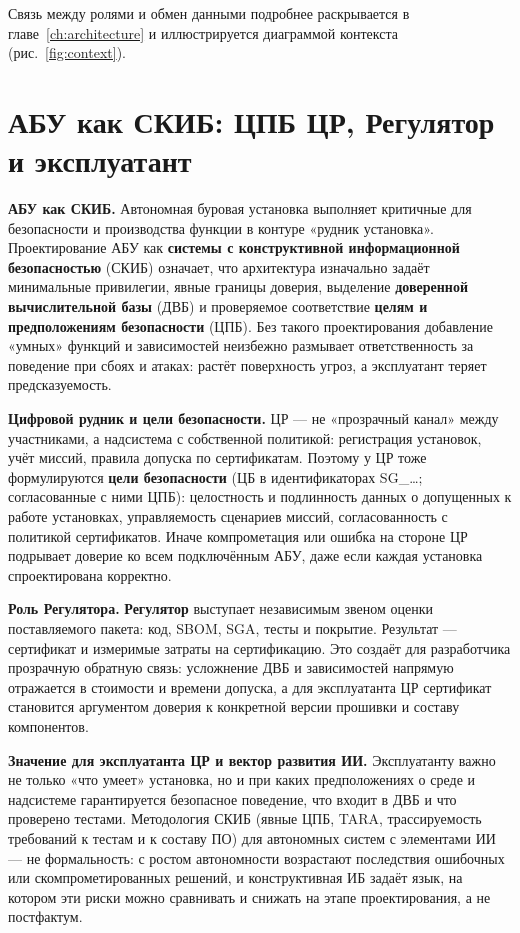 Связь между ролями и обмен данными подробнее раскрывается в главе~\ref{ch:architecture} и иллюстрируется диаграммой контекста (рис.~\ref{fig:context}).

\section{АБУ как СКИБ: ЦПБ ЦР, Регулятор и эксплуатант}
\label{sec:skib-why}

\textbf{АБУ как СКИБ.} Автономная буровая установка выполняет критичные для безопасности и производства функции в контуре «рудник\,\textemdash\,установка». Проектирование АБУ как \textbf{системы с конструктивной информационной безопасностью} (СКИБ) означает, что архитектура изначально задаёт минимальные привилегии, явные границы доверия, выделение \textbf{доверенной вычислительной базы} (ДВБ) и проверяемое соответствие \textbf{целям и предположениям безопасности} (ЦПБ). Без такого проектирования добавление «умных» функций и зависимостей неизбежно размывает ответственность за поведение при сбоях и атаках: растёт поверхность угроз, а эксплуатант теряет предсказуемость.

\textbf{Цифровой рудник и цели безопасности.} ЦР --- не «прозрачный канал» между участниками, а надсистема с собственной политикой: регистрация установок, учёт миссий, правила допуска по сертификатам. Поэтому у ЦР тоже формулируются \textbf{цели безопасности} (ЦБ в идентификаторах SG\_\ldots{}; согласованные с ними ЦПБ): целостность и подлинность данных о допущенных к работе установках, управляемость сценариев миссий, согласованность с политикой сертификатов. Иначе компрометация или ошибка на стороне ЦР подрывает доверие ко всем подключённым АБУ, даже если каждая установка спроектирована корректно.

\textbf{Роль Регулятора.} \textbf{Регулятор} выступает независимым звеном оценки поставляемого пакета: код, SBOM, SGA, тесты и покрытие. Результат --- сертификат и измеримые затраты на сертификацию. Это создаёт для разработчика прозрачную обратную связь: усложнение ДВБ и зависимостей напрямую отражается в стоимости и времени допуска, а для эксплуатанта ЦР сертификат становится аргументом доверия к конкретной версии прошивки и составу компонентов.

\textbf{Значение для эксплуатанта ЦР и вектор развития ИИ.} Эксплуатанту важно не только «что умеет» установка, но и при каких предположениях о среде и надсистеме гарантируется безопасное поведение, что входит в ДВБ и что проверено тестами. Методология СКИБ (явные ЦПБ, TARA, трассируемость требований к тестам и к составу ПО) для автономных систем с элементами ИИ --- не формальность: с ростом автономности возрастают последствия ошибочных или скомпрометированных решений, и конструктивная ИБ задаёт язык, на котором эти риски можно сравнивать и снижать на этапе проектирования, а не постфактум.

